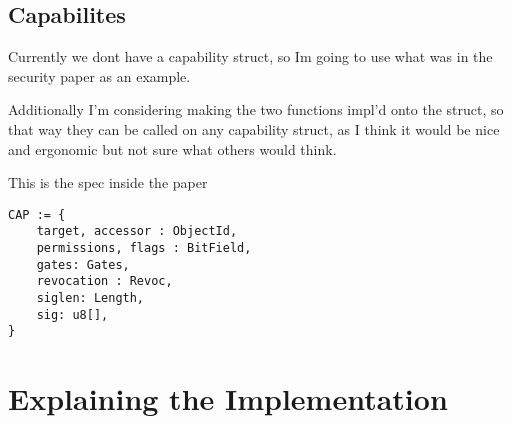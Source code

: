 \documentclass{article}
\begin{document}
\subsection{Capabilites}

Currently we dont have a capability struct, so Im going to use
what was in the security paper as an example.

Additionally I'm considering making the two functions impl'd onto the struct,
so that way they can be called on any capability struct, as I think it would
be nice and ergonomic but not sure what others would think.

This is the spec inside the paper

\begin{verbatim}
CAP := {
    target, accessor : ObjectId,
    permissions, flags : BitField,
    gates: Gates,
    revocation : Revoc,
    siglen: Length,
    sig: u8[],
}
\end{verbatim}


\section{Explaining the Implementation}
\end{document}
